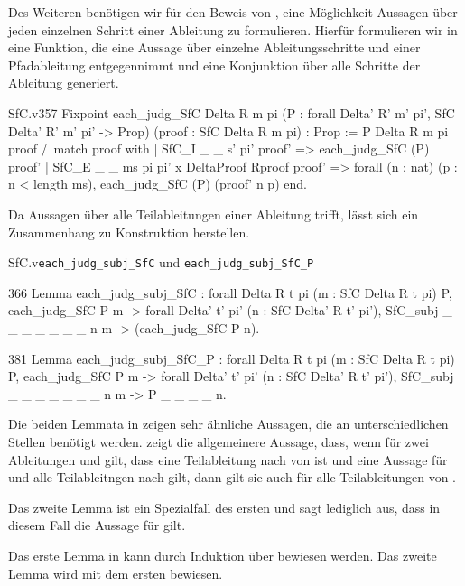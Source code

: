 Des Weiteren benötigen wir für den Beweis von , eine Möglichkeit Aussagen über jeden  einzelnen Schritt einer Ableitung zu formulieren. Hierfür formulieren wir in  eine Funktion, die eine Aussage  über einzelne Ableitungsschritte und einer Pfadableitung  entgegennimmt und eine Konjunktion über alle Schritte der Ableitung generiert.
\begin{code}{SfC.v}{}{357}
Fixpoint each_judg_SfC {Delta R m pi} 
  (P : forall Delta' R' m' pi', SfC Delta' R' m' pi' -> Prop) 
  (proof : SfC Delta R m pi) : Prop :=
    P Delta R m pi proof /\
      match proof with
      | SfC_I _ _ s' pi' proof' => each_judg_SfC (P) proof'
      | SfC_E _ _ ms pi pi' x DeltaProof Rproof proof' =>
          forall (n : nat) (p : n < length ms),
            each_judg_SfC (P) (proof' n p)
      end.
\end{code}

Da  Aussagen über alle Teilableitungen einer Ableitung trifft, lässt sich ein Zusammenhang zu Konstruktion  herstellen.
\begin{multicode}[each_judg_subj_SfC]{SfC.v}{}{\texttt{each\_judg\_subj\_SfC} und \texttt{each\_judg\_subj\_SfC\_P}}
    \begin{mcode}{366}
Lemma each_judg_subj_SfC : forall Delta R t pi (m : SfC Delta R t pi) P,
    each_judg_SfC P m ->
      forall Delta' t' pi' (n : SfC Delta' R t' pi'), 
        SfC_subj _ _ _ _ _ _ _ n m ->
          (each_judg_SfC P n).
\end{mcode}
\pagebreak   
\begin{mcode}{381}
Lemma each_judg_subj_SfC_P : forall Delta R t pi (m : SfC Delta R t pi) P,
    each_judg_SfC P m ->
      forall Delta' t' pi' (n : SfC Delta' R t' pi'), 
        SfC_subj _ _ _ _ _ _ _ n m ->
          P _ _ _ _ n.
\end{mcode}
\end{multicode}
\begin{remark}
    Die beiden Lemmata in  zeigen sehr ähnliche Aussagen, die an unterschiedlichen Stellen benötigt werden.  zeigt die allgemeinere Aussage, dass, wenn für zwei Ableitungen  und  gilt, dass  eine Teilableitung nach  von  ist und eine Aussage  für  und alle Teilableitngen nach  gilt, dann gilt sie auch für alle Teilableitungen von .
    
    Das zweite Lemma ist ein Spezialfall des ersten und sagt lediglich aus, dass in diesem Fall die Aussage für  gilt.
\end{remark}
Das erste Lemma in  kann durch Induktion über  bewiesen werden. Das zweite Lemma wird mit dem ersten bewiesen.

